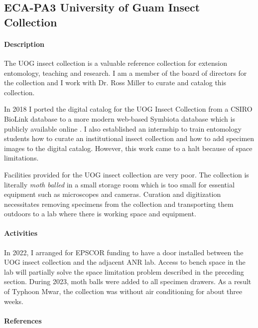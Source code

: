 \subsection{ECA-PA3 University of Guam Insect Collection}
\begin{refsection}
	
\paragraph{Description}

The UOG insect collection is a valuable reference collection for extension
entomology, teaching and research. I am a member of the board of directors
for the collection and I work with Dr. Ross Miller to curate and catalog
this collection.

In 2018 I ported the digital catalog for the UOG Insect Collection from a
CSIRO BioLink database to a more modern web-based Symbiota database
which is publicly available online \cite{moore_scan_2023}. I also established an internship to train entomology students how to curate an institutional insect collection and how to add specimen images to the digital catalog\cite{moore_internship_2018}. However, this work came to a halt because of space limitations. 

Facilities provided for the UOG insect collection are very poor. The collection is literally \textit{moth balled} in a small storage room which is too small for essential equipment such as microscopes and cameras. Curation and digitization necessitates removing specimens from the collection and transporting them outdoors to a lab where there is working space and equipment.

\paragraph{Activities}

In 2022, I arranged for EPSCOR funding to have a door installed between the UOG insect collection and the adjacent ANR lab. Access to bench space in the lab will partially solve the space limitation problem described in the preceding section. During 2023, moth balls were added to all specimen drawers. As a result of Typhoon Mwar, the collection was without air conditioning for about three weeks.

\paragraph{References}
\printbibliography[heading=none]
\end{refsection}

